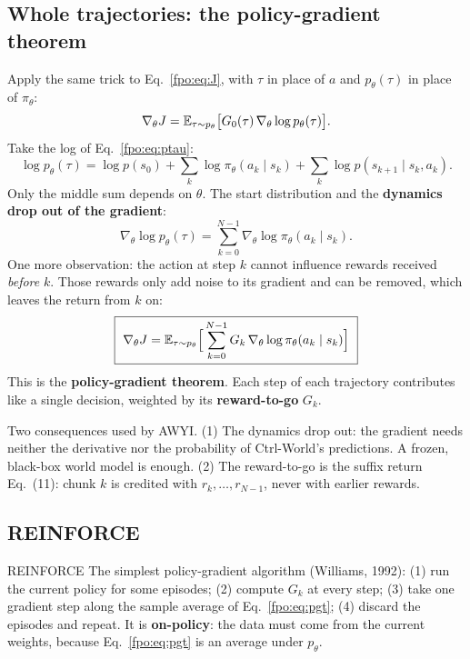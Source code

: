 \subsection{Whole trajectories: the policy-gradient theorem}
Apply the same trick to Eq.~\eqref{fpo:eq:J}, with $\tau$ in place of $a$ and $p_\theta(\tau)$ in place of $\pi_\theta$:
\[\nabla_\theta J=\mathbb{E}_{\tau\sim p_\theta}\big[G_0(\tau)\,\nabla_\theta\log p_\theta(\tau)\big].\]
Take the log of Eq.~\eqref{fpo:eq:ptau}:
\[
\log p_\theta(\tau)=\log p(s_0)+\sum_k\log\pi_\theta(a_k\mid s_k)+\sum_k\log p(s_{k+1}\mid s_k,a_k).
\]
Only the middle sum depends on $\theta$. The start distribution and the \textbf{dynamics drop out of the gradient}:
\begin{equation}
\nabla_\theta\log p_\theta(\tau)=\sum_{k=0}^{N-1}\nabla_\theta\log\pi_\theta(a_k\mid s_k).
\end{equation}
One more observation: the action at step $k$ cannot influence rewards received \emph{before} $k$. Those rewards only add noise to its gradient and can be removed, which leaves the return from $k$ on:
\begin{equation}
\boxed{\ \nabla_\theta J=\mathbb{E}_{\tau\sim p_\theta}\Big[\sum_{k=0}^{N-1}G_k\,\nabla_\theta\log\pi_\theta(a_k\mid s_k)\Big]\ }
\label{fpo:eq:pgt}
\end{equation}
This is the \textbf{policy-gradient theorem}. Each step of each trajectory contributes like a single decision, weighted by its \textbf{reward-to-go} $G_k$.

\begin{paperlink}
Two consequences used by AWYI. (1) The dynamics drop out: the gradient needs neither the derivative nor the probability of Ctrl-World's predictions. A frozen, black-box world model is enough. (2) The reward-to-go is the suffix return Eq.~(11): chunk $k$ is credited with $r_k,\dots,r_{N-1}$, never with earlier rewards.
\end{paperlink}

\subsection{REINFORCE}
\begin{newc}{REINFORCE}
The simplest policy-gradient algorithm (Williams, 1992): (1) run the current policy for some episodes; (2) compute $G_k$ at every step; (3) take one gradient step along the sample average of Eq.~\eqref{fpo:eq:pgt}; (4) discard the episodes and repeat. It is \textbf{on-policy}: the data must come from the current weights, because Eq.~\eqref{fpo:eq:pgt} is an average under $p_\theta$.
\end{newc}

